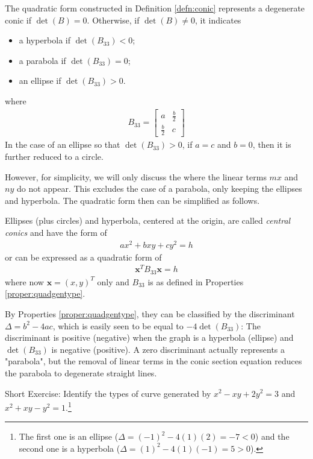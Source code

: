 \begin{proper}
\label{proper:quadgentype}
The quadratic form constructed in Definition \ref{defn:conic} represents a degenerate conic if $\det(B) = 0$. Otherwise, if $\det(B) \neq 0$, it indicates
\begin{itemize}
    \item a hyperbola if $\det(B_{33}) < 0$;
    \item a parabola if $\det(B_{33}) = 0$;
    \item an ellipse if $\det(B_{33}) > 0$.
\end{itemize}
where
\begin{align*}
B_{33} = 
\begin{bmatrix}
a & \frac{b}{2} \\
\frac{b}{2} & c 
\end{bmatrix}
\end{align*}
In the case of an ellipse so that $\det(B_{33}) > 0$, if $a = c$ and $b = 0$, then it is further reduced to a circle.
\end{proper}
However, for simplicity, we will only discuss the  where the linear terms $mx$ and $ny$ do not appear. This excludes the case of a parabola, only keeping the ellipses and hyperbola. The quadratic form then can be simplified as follows.
\begin{proper}
\label{proper:quadcentraltype}
Ellipses (plus circles) and hyperbola, centered at the origin, are called \textit{central conics} and have the form of
\begin{align*}
ax^2 + bxy + cy^2 = h
\end{align*}
or can be expressed as a quadratic form of
\begin{align*}
\textbf{x}^T B_{33} \textbf{x} = h
\end{align*}
where now $\textbf{x} = (x,y)^T$ only and $B_{33}$ is as defined in Properties \ref{proper:quadgentype}.
\end{proper}
By Properties \ref{proper:quadgentype}, they can be classified by the discriminant $\Delta = b^2 - 4ac$, which is easily seen to be equal to $-4\det(B_{33})$: The discriminant is positive (negative) when the graph is a hyperbola (ellipse) and $\det(B_{33})$ is negative (positive). A zero discriminant actually represents a "parabola", but the removal of linear terms in the conic section equation reduces the parabola to degenerate straight lines. \par
Short Exercise: Identify the types of curve generated by $x^2 - xy + 2y^2 = 3$ and $x^2 + xy - y^2 = 1$.\footnote{The first one is an ellipse ($\Delta = (-1)^2 - 4(1)(2) = -7 < 0$) and the second one is a hyperbola ($\Delta = (1)^2 - 4(1)(-1) = 5 > 0$).}\par

